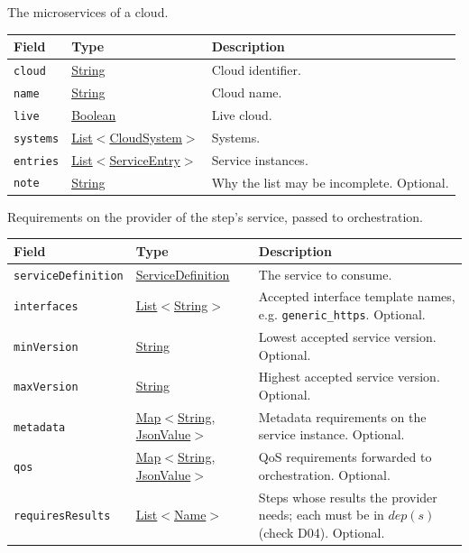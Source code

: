 \documentclass[a4paper]{arrowhead}
\newcommand{\mref}[1]{{\textcolor{ArrowheadPurple}{\hyperref[sec:model:#1]{#1}}}}
\newcommand{\pref}[1]{{\textcolor{ArrowheadGrey}{\hyperref[sec:model:primitives:#1]{#1}}}}
\begin{document}
The microservices of a cloud.

{\small
\begin{longtable}{|p{3.9cm}|p{4.4cm}|p{7.5cm}|}

\hline
\rowcolor{gray!33} Field & Type & Description \\ \hline
\endhead
\texttt{cloud} & \pref{String} & Cloud identifier. \\ \hline
\texttt{name} & \pref{String} & Cloud name. \\ \hline
\texttt{live} & \pref{Boolean} & Live cloud. \\ \hline
\texttt{systems} & \pref{List}$<$\mref{CloudSystem}$>$ & Systems. \\ \hline
\texttt{entries} & \pref{List}$<$\mref{ServiceEntry}$>$ & Service instances. \\ \hline
\texttt{note} & \pref{String} & Why the list may be incomplete. Optional. \\ \hline
\end{longtable}
}

Requirements on the provider of the step's service, passed to orchestration.

{\small
\begin{longtable}{|p{3.9cm}|p{4.4cm}|p{7.5cm}|}

\hline
\rowcolor{gray!33} Field & Type & Description \\ \hline
\endhead
\texttt{service\allowbreak{}Definition} & \pref{ServiceDefinition} & The service to consume. \\ \hline
\texttt{interfaces} & \pref{List}$<$\pref{String}$>$ & Accepted interface template names, e.g. \texttt{generic\_\allowbreak{}https}. Optional. \\ \hline
\texttt{minVersion} & \pref{String} & Lowest accepted service version. Optional. \\ \hline
\texttt{maxVersion} & \pref{String} & Highest accepted service version. Optional. \\ \hline
\texttt{metadata} & \pref{Map}$<$\pref{String}, \pref{JsonValue}$>$ & Metadata requirements on the service instance. Optional. \\ \hline
\texttt{qos} & \pref{Map}$<$\pref{String}, \pref{JsonValue}$>$ & QoS requirements forwarded to orchestration. Optional. \\ \hline
\texttt{requires\allowbreak{}Results} & \pref{List}$<$\pref{Name}$>$ & Steps whose results the provider needs; each must be in $dep(s)$ (check D04). Optional. \\ \hline
\end{longtable}
}
\end{document}
